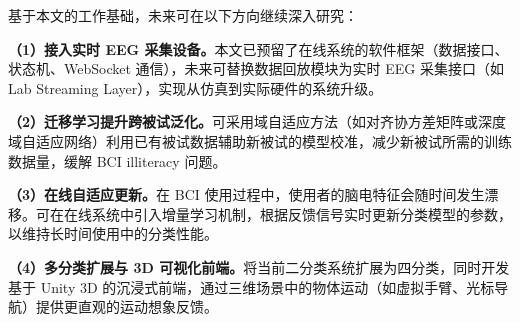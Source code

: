 基于本文的工作基础，未来可在以下方向继续深入研究：

\textbf{（1）接入实时 EEG 采集设备。}本文已预留了在线系统的软件框架（数据接口、状态机、WebSocket 通信），未来可替换数据回放模块为实时 EEG 采集接口（如 Lab Streaming Layer），实现从仿真到实际硬件的系统升级。

\textbf{（2）迁移学习提升跨被试泛化。}可采用域自适应方法（如对齐协方差矩阵或深度域自适应网络）利用已有被试数据辅助新被试的模型校准，减少新被试所需的训练数据量，缓解 BCI illiteracy 问题。

\textbf{（3）在线自适应更新。}在 BCI 使用过程中，使用者的脑电特征会随时间发生漂移。可在在线系统中引入增量学习机制，根据反馈信号实时更新分类模型的参数，以维持长时间使用中的分类性能。

\textbf{（4）多分类扩展与 3D 可视化前端。}将当前二分类系统扩展为四分类，同时开发基于 Unity 3D 的沉浸式前端，通过三维场景中的物体运动（如虚拟手臂、光标导航）提供更直观的运动想象反馈。


\label{article}  %

